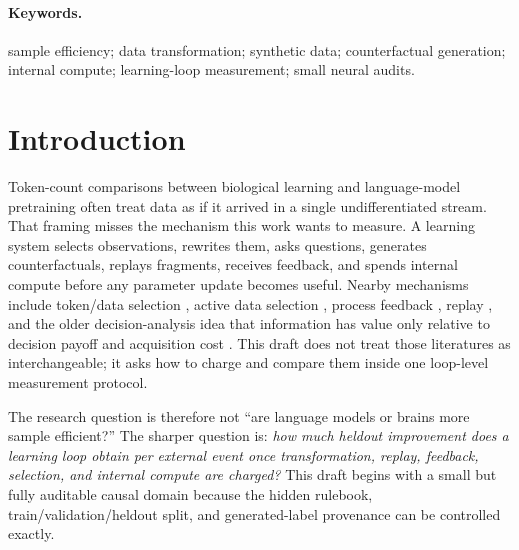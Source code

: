 \documentclass[11pt]{article}
\begin{document}
\paragraph{Keywords.}
sample efficiency; data transformation; synthetic data; counterfactual
generation; internal compute; learning-loop measurement; small neural audits.

\section{Introduction}

Token-count comparisons between biological learning and language-model
pretraining often treat data as if it arrived in a single undifferentiated
stream. That framing misses the mechanism this work wants to measure. A
learning system selects observations, rewrites them, asks questions, generates
counterfactuals, replays fragments, receives feedback, and spends internal
compute before any parameter update becomes useful.
Nearby mechanisms include token/data selection
\cite{lin2024rho1,li2024datacomp,xia2024less}, active data selection
\cite{mackay1992active,settles2009activelearning}, process feedback
\cite{lightman2023verify}, replay \cite{schaul2015prioritized}, and the older
decision-analysis idea that information has value only relative to decision
payoff and acquisition cost \cite{howard1966information}. This draft does not
treat those literatures as interchangeable; it asks how to charge and compare
them inside one loop-level measurement protocol.

The research question is therefore not ``are language models or brains more
sample efficient?'' The sharper question is:
\emph{how much heldout improvement does a learning loop obtain per external
event once transformation, replay, feedback, selection, and internal compute
are charged?} This draft begins with a small but fully auditable causal domain
because the hidden rulebook, train/validation/heldout split, and generated-label
provenance can be controlled exactly.
\end{document}
